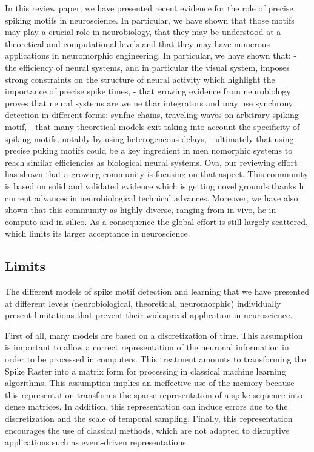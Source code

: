 \documentclass[brainsci, %
               review,submit,pdftex,moreauthors
               ]{Definitions/mdpi}
\begin{document}
In this review paper, we have presented recent evidence for the role of precise spiking motifs in neuroscience. In particular, we have shown that those motifs may play a crucial role in neurobiology, that they may be understood at a theoretical and computational levels and that they may have numerous applications in neuromorphic engineering. In particular, we have shown that:
- the efficiency of neural systems, and in particular the visual system, imposes strong constraints on the structure of neural activity which highlight the importance of precise spike times,
- that growing evidence from neurobiology proves that neural systems are we ne thar integrators and may use synchrony detection in different forms: synfne chains, traveling waves on arbitrary spiking motif,
- that many theoretical models exit taking into account the specificity of spiking motifs, notably by using heterogeneous delays,
- ultimately that using precise puking motifs could be a key ingredient in men nomorphic systems to reach similar efficiencies as biological neural systems. Ova, our reviewing effort has shown that a growing community is focusing on that aspect. This community is based on solid and validated evidence which is getting novel grounds thanks h current advances in neurobiological technical advances. Moreover, we have also shown that this community as highly diverse, ranging from in vivo, he in computo and in silico. As a consequence the global effort is still largely scattered, which limits its larger acceptance in neuroscience. 

\subsection{Limits}

The different models of spike motif detection and learning that we have presented at different levels (neurobiological, theoretical, neuromorphic) individually present limitations that prevent their widespread application in neuroscience.

First of all, many models are based on a discretization of time. This assumption is important to allow a correct representation of the neuronal information in order to be processed in computers. This treatment amounts to transforming the Spike Raster into a matrix form for processing in classical machine learning algorithms. This assumption implies an ineffective use of the memory because this representation transforms the sparse representation of a spike sequence into dense matrices. In addition, this representation can induce errors due to the discretization and the scale of temporal sampling. Finally, this representation encourages the use of classical methods, which are not adapted to disruptive applications such as event-driven representations.
\end{document}
